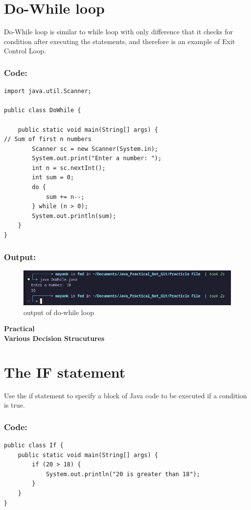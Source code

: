 \documentclass[a4paper,12pt]{article}
\newcounter{practicalno} %
\newcommand{\practicaltitle}[1]{
    \stepcounter{practicalno} %
    \newpage
    \begin{center}
        \vspace{1cm}
        \Large\textbf{Practical \thepracticalno} \\
        \vspace{0.5cm}
        \Large\textbf{#1} %
        \normalsize\vspace{1cm}
    \end{center}
}
\begin{document}
\section{Do-While loop}
Do-While loop is similar to while loop with only difference that it checks for condition
after executing the statements, and therefore is an example of Exit Control Loop.
\subsubsection{Code: }
\begin{lstlisting}
import java.util.Scanner;

public class DoWhile {

    public static void main(String[] args) {
// Sum of first n numbers
        Scanner sc = new Scanner(System.in);
        System.out.print("Enter a number: ");
        int n = sc.nextInt();
        int sum = 0;
        do {
            sum += n--;
        } while (n > 0);
        System.out.println(sum);
    }
}
\end{lstlisting}
\subsubsection{Output: }
\begin{figure}[H]
    \centering
    \includegraphics[width=0.9\linewidth]{images/image.png}
    \caption{output of do-while loop}
    \label{fig:sample_image}
\end{figure}

\setcounter{section}{0}

\practicaltitle{Various Decision Strucutures}

\section{The IF statement}
Use the if statement to specify a block of Java code to be executed if a condition is true.
\subsubsection{Code: }
\begin{lstlisting}
public class If {
    public static void main(String[] args) {
        if (20 > 18) {
            System.out.println("20 is greater than 18");
        }
    }
}    
\end{lstlisting}
\end{document}
